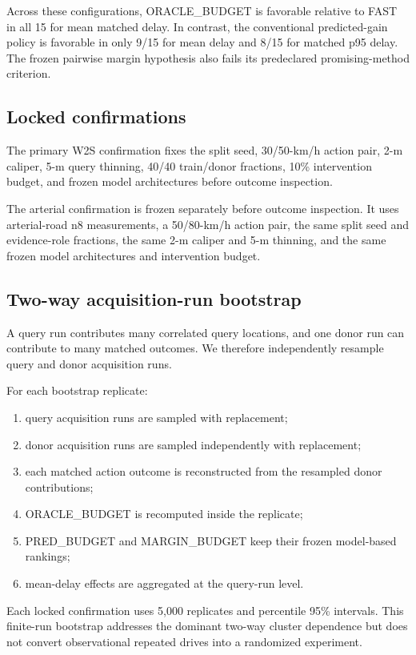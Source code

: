 \documentclass[journal]{IEEEtran}
\begin{document}
Across these configurations, ORACLE\_BUDGET is favorable relative to FAST in all 15 for mean matched delay. In contrast, the conventional predicted-gain policy is favorable in only 9/15 for mean delay and 8/15 for matched p95 delay. The frozen pairwise margin hypothesis also fails its predeclared promising-method criterion.

\subsection{Locked confirmations}
The primary W2S confirmation fixes the split seed, 30/50-km/h action pair, 2-m caliper, 5-m query thinning, 40/40 train/donor fractions, 10\% intervention budget, and frozen model architectures before outcome inspection.

The arterial confirmation is frozen separately before outcome inspection. It uses arterial-road n8 measurements, a 50/80-km/h action pair, the same split seed and evidence-role fractions, the same 2-m caliper and 5-m thinning, and the same frozen model architectures and intervention budget.

\subsection{Two-way acquisition-run bootstrap}
A query run contributes many correlated query locations, and one donor run can contribute to many matched outcomes. We therefore independently resample query and donor acquisition runs.

For each bootstrap replicate:
\begin{enumerate}
\item query acquisition runs are sampled with replacement;
\item donor acquisition runs are sampled independently with replacement;
\item each matched action outcome is reconstructed from the resampled donor contributions;
\item ORACLE\_BUDGET is recomputed inside the replicate;
\item PRED\_BUDGET and MARGIN\_BUDGET keep their frozen model-based rankings;
\item mean-delay effects are aggregated at the query-run level.
\end{enumerate}

Each locked confirmation uses 5,000 replicates and percentile 95\% intervals. This finite-run bootstrap addresses the dominant two-way cluster dependence but does not convert observational repeated drives into a randomized experiment.
\end{document}
